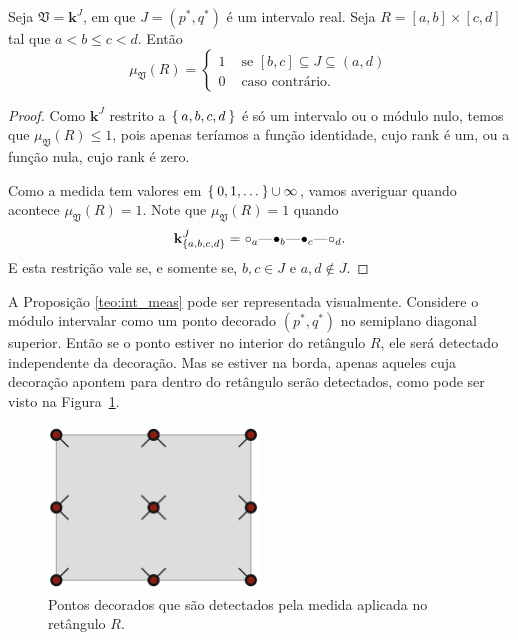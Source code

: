 \begin{propo}\label{teo:int_meas}
    Seja $\mathfrak{V} = \mathbf{k}^J$, em que $J=(p^*, q^*)$ é um intervalo real. Seja $R=[a,b]\times[c,d]$
    tal que $a < b \leq c < d$. Então
    \begin{equation*}
        \mu_{\mathfrak{V}}(R) = \left\{
        \begin{split}
            1 & \text{ se } [b,c] \subseteq J \subseteq (a,d) \\
            0 & \text{ caso contrário.}
        \end{split}
        \right.
    \end{equation*}
\end{propo} 
\begin{proof}
    Como $\mathbf{k}^J$ restrito a $\Set{a,b,c,d}$ é só um intervalo ou o módulo nulo, temos que $\mu_{\mathfrak{V}}(R)
    \leq 1$, pois apenas teríamos a função identidade, cujo rank é um, ou a função nula, cujo rank é zero. 

    Como a medida tem valores em $\Set{0,1,\dots} \cup {\infty}$, vamos averiguar quando acontece $\mu_{\mathfrak{V}}(R)
    = 1$. Note que $\mu_{\mathfrak{V}}(R) = 1$ quando 
    \begin{equation*}    
        \mathbf{k}^J_{\{a,b,c,d\}} = \qoff{a} \qem \qon{b} \qem \qon{c} \qem \qoff{d}. 
    \end{equation*}
    E esta restrição vale se, e somente se, $b,c \in J$ e $a,d \nin J$.
\end{proof}

A Proposição \ref{teo:int_meas} pode ser representada visualmente. Considere o módulo intervalar como um ponto
decorado $(p^*, q^*)$ no semiplano diagonal superior. Então se o ponto estiver no interior do retângulo
$R$, ele será detectado independente da decoração. Mas se estiver na borda, apenas aqueles cuja decoração
apontem para dentro do retângulo serão detectados, como pode ser visto na Figura~\ref{fig:dec_rect}.
\begin{figure}[htpb!]
    \centering
    \includegraphics[width=0.5\textwidth]{images/rect_points.png}
    \caption{Pontos decorados que são detectados pela medida aplicada no retângulo $R$.}
    \label{fig:dec_rect}
\end{figure}

